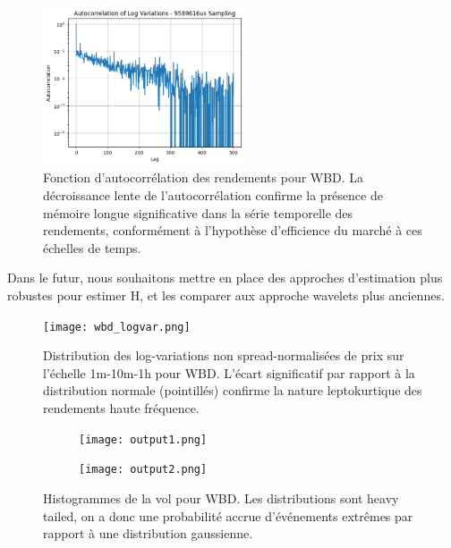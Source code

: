 \documentclass[10pt,a4paper]{article}
\theoremstyle{definition}
\theoremstyle{remark}
\begin{document}
\begin{figure}[h!]
    \centering
        \includegraphics[width=0.53\textwidth]{autocorr.png}
    \caption{Fonction d'autocorrélation des rendements pour WBD. La décroissance lente de l'autocorrélation confirme la présence de mémoire longue significative dans la série temporelle des rendements, conformément à l'hypothèse d'efficience du marché à ces échelles de temps.}
    \label{fig:autocorr_wbd}
\end{figure}



Dans le futur, nous souhaitons mettre en place des approches d'estimation plus robustes \cite{chong2024minimax, chong2024clt} pour estimer H, et les comparer aux approche wavelets plus anciennes. 



\begin{figure}[h!]
    \centering
        \texttt{[image: wbd\_logvar.png]}
    \caption{Distribution des log-variations non spread-normalisées de prix sur l'échelle 1m-10m-1h pour WBD. L'écart significatif par rapport à la distribution normale (pointillés) confirme la nature leptokurtique des rendements haute fréquence.}
    \label{fig:log_variations_wbd}
\end{figure}
\begin{figure}[h!]
    \centering
    \begin{subfigure}[b]{0.48\textwidth}
        \texttt{[image: output1.png]}
    \end{subfigure}
    \hfill
    \begin{subfigure}[b]{0.48\textwidth}
        \texttt{[image: output2.png]}
    \end{subfigure}
    \caption{Histogrammes de la vol pour WBD. Les distributions sont heavy tailed, on a donc une probabilité accrue d'événements extrêmes par rapport à une distribution gaussienne.}
    \label{fig:volatility_hist}
\end{figure}
\end{document}
